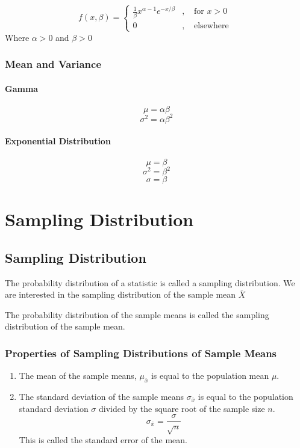 \documentclass{book}
\begin{document}
$$f(x, \beta) = \left \{
\begin{matrix}
\frac{1}{\beta}x^{\alpha-1}e^{-x/\beta} &,& \text{ for } x >0\\
0 &,& \text{ elsewhere }
\end{matrix}
\right.
$$
Where $\alpha > 0$  and $\beta >0$
\subsection{Mean and Variance}
\subsubsection{Gamma}
$$\mu=\alpha \beta$$
$$\sigma^2 = \alpha \beta^2$$

\subsubsection{Exponential Distribution}
$$\mu = \beta $$
$$\sigma^2 = \beta^2$$
$$\sigma = \beta$$


\addtocounter{chapter}{1}
\chapter{Sampling Distribution}
\addtocounter{section}{2}
\section{Sampling Distribution}
The probability distribution of a statistic is called a sampling distribution. We are interested in the sampling distribution of the sample mean $\overline X$

The probability distribution of the sample means is called the sampling distribution of the sample mean.

\subsection{Properties of Sampling Distributions of Sample Means}
\begin{enumerate}
\item The mean of the sample means, $\mu_{\overline x}$ is equal to the population mean $\mu$.
\item The standard deviation of the sample means $\sigma_{\overline x}$
is equal to the population standard deviation  $\sigma$ divided by the square root of the sample size $n$.
$$\sigma_{\overline x} = \frac{\sigma}{\sqrt{n}}$$
This is called the standard error of the mean.
\end{enumerate}
\end{document}
